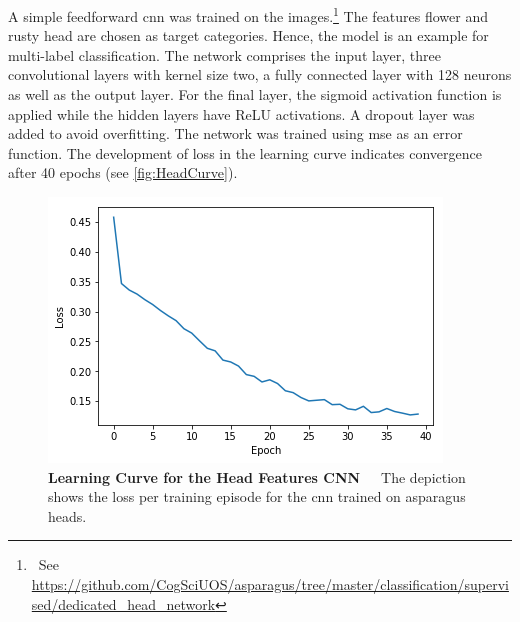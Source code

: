\bigskip
A simple feedforward \acrshort{cnn} was trained on the images.\footnote{~See \url{https://github.com/CogSciUOS/asparagus/tree/master/classification/supervised/dedicated\_head\_network}} The features flower and rusty head are chosen as target categories. Hence, the  model is an example for multi-label classification. The network comprises the input layer, three convolutional layers with kernel size two, a fully connected layer with 128 neurons as well as the output layer. For the final layer, the sigmoid activation function is applied while the hidden layers have ReLU activations. A dropout layer was added to avoid overfitting. The network was trained using \acrfull{mse} as an error function. The development of loss in the learning curve indicates convergence after 40 epochs (see \autoref{fig:HeadCurve}).

\begin{table}[!b]
	\centering
	\caption[Head Features CNN Performance]{\textbf{Performance of Head Features CNN}~~~Performance of the \acrshort{cnn} trained on asparagus heads.}
	\label{tab:performance_measures_head_based}
\end{table}

\begin{figure}[!htb]
	\centering
	\includegraphics[scale=1.8]{Figures/chapter04/head_curve.png}
	\decoRule
	\caption[Head Features CNN Learning Curve]{\textbf{Learning Curve for the Head Features CNN}~~~The depiction shows the loss per training episode for the \acrshort{cnn} trained on asparagus heads.}
	\label{fig:HeadCurve}
\end{figure}	

